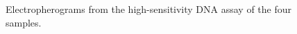 \documentclass[a4paper,12pt]{article}
\begin{document}
\begin{figure}
\caption{Electropherograms from the high-sensitivity DNA assay of the four samples.}\label{fig:digestion}
\end{figure}
\end{document}
